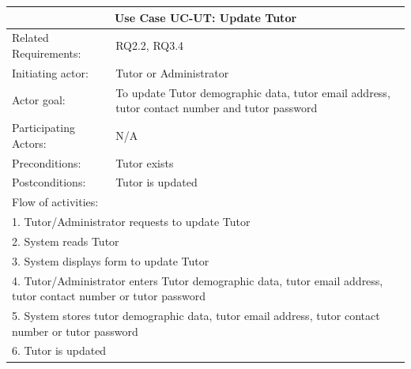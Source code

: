 \documentclass[12pt]{article}
\begin{document}
{		%
		\begin{tabular}{| l | p{10cm}| }
			\hline\multicolumn{2}{|c|}{ \textbf{Use Case UC-UT: Update Tutor}} \\ \hline
			Related Requirements: & RQ2.2, RQ3.4 \\ \hline
			Initiating actor: & Tutor or Administrator \\ \hline
			Actor goal: & To update Tutor demographic data, tutor email address, tutor contact number and tutor password\\ \hline
			Participating Actors: & N/A\\ \hline
			Preconditions:& Tutor exists\\ \hline
			Postconditions: & Tutor is updated\\ \hline
			\multicolumn{2}{|l|}{Flow of activities:}\\ \hline
			\multicolumn{2}{|p{15cm}|}{1. Tutor/Administrator requests to update Tutor}\\
			\multicolumn{2}{|p{15cm}|}{2. System reads Tutor}\\
			\multicolumn{2}{|p{15cm}|}{3. System displays form to update Tutor}\\
			\multicolumn{2}{|p{15cm}|}{4. Tutor/Administrator enters Tutor demographic data, tutor email address, tutor contact number or tutor password}	\\		
			\multicolumn{2}{|p{15cm}|}{5. System stores tutor demographic data, tutor email address, tutor contact number or tutor password}\\
			\multicolumn{2}{|l|}{6. Tutor is updated}	
			\\ \hline		
		\end{tabular}



}
\end{document}
